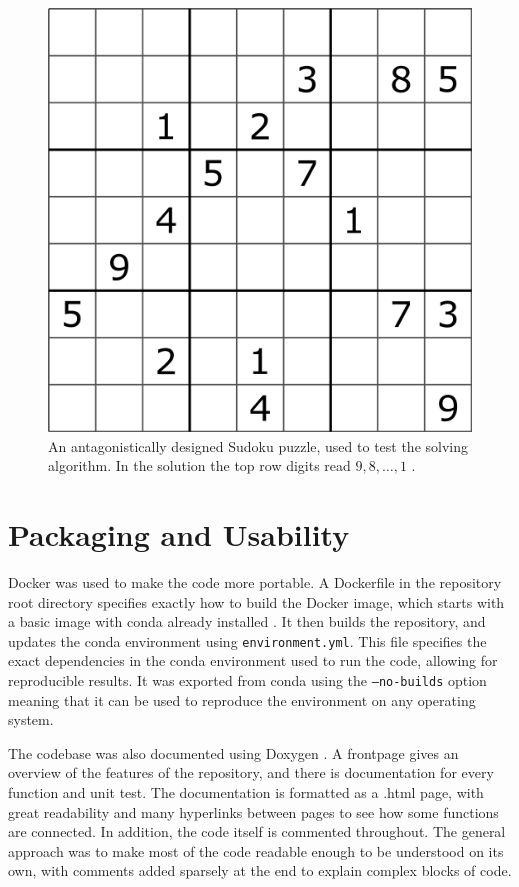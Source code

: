 \documentclass[12pt]{article}
\begin{document}
\begin{figure}[hbt]
    \includegraphics[scale=0.3]{Sudoku_puzzle_hard_for_brute_force.png}
    \caption{An antagonistically designed Sudoku puzzle, used to test the solving algorithm. In the solution the top row digits read $9, 8, \ldots, 1$ \cite{antagonist}.}
    \label{antagonist_clues}
\end{figure}

\section{Packaging and Usability}

Docker was used to make the code more portable.
A Dockerfile in the repository root directory specifies exactly how to build the Docker image, which starts with a basic image with conda already installed \cite{docker}.
It then builds the repository, and updates the conda environment using \texttt{environment.yml}.
This file specifies the exact dependencies in the conda environment used to run the code, allowing for reproducible results.
It was exported from conda using the \texttt{--no-builds} option meaning that it can be used to reproduce the environment on any operating system.

The codebase was also documented using Doxygen \cite{doxygen}.
A frontpage gives an overview of the features of the repository, and there is documentation for every function and unit test.
The documentation is formatted as a .html page, with great readability and many hyperlinks between pages to see how some functions are connected.
In addition, the code itself is commented throughout.
The general approach was to make most of the code readable enough to be understood on its own, with comments added sparsely at the end to explain complex blocks of code.
\end{document}
